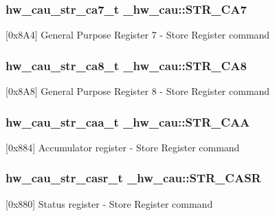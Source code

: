 \subsubsection[{\texorpdfstring{S\+T\+R\+\_\+\+C\+A7}{STR_CA7}}]{ {\bf hw\+\_\+cau\+\_\+str\+\_\+ca7\+\_\+t} \+\_\+hw\+\_\+cau\+::\+S\+T\+R\+\_\+\+C\+A7}\hypertarget{struct__hw__cau_a94bbb5f61eb9caa24f5c78de79b6b953}{}\label{struct__hw__cau_a94bbb5f61eb9caa24f5c78de79b6b953}
\mbox{[}0x8\+A4\mbox{]} General Purpose Register 7 -\/ Store Register command 
\subsubsection[{\texorpdfstring{S\+T\+R\+\_\+\+C\+A8}{STR_CA8}}]{ {\bf hw\+\_\+cau\+\_\+str\+\_\+ca8\+\_\+t} \+\_\+hw\+\_\+cau\+::\+S\+T\+R\+\_\+\+C\+A8}\hypertarget{struct__hw__cau_aac8ee0289c3891e730b41f1d7d7a96d1}{}\label{struct__hw__cau_aac8ee0289c3891e730b41f1d7d7a96d1}
\mbox{[}0x8\+A8\mbox{]} General Purpose Register 8 -\/ Store Register command 
\subsubsection[{\texorpdfstring{S\+T\+R\+\_\+\+C\+AA}{STR_CAA}}]{ {\bf hw\+\_\+cau\+\_\+str\+\_\+caa\+\_\+t} \+\_\+hw\+\_\+cau\+::\+S\+T\+R\+\_\+\+C\+AA}\hypertarget{struct__hw__cau_a1cb36095fd06149823fdd1180df6c7b2}{}\label{struct__hw__cau_a1cb36095fd06149823fdd1180df6c7b2}
\mbox{[}0x884\mbox{]} Accumulator register -\/ Store Register command 
\subsubsection[{\texorpdfstring{S\+T\+R\+\_\+\+C\+A\+SR}{STR_CASR}}]{ {\bf hw\+\_\+cau\+\_\+str\+\_\+casr\+\_\+t} \+\_\+hw\+\_\+cau\+::\+S\+T\+R\+\_\+\+C\+A\+SR}\hypertarget{struct__hw__cau_ad7073dfe5070089d5d75dee51bf6410f}{}\label{struct__hw__cau_ad7073dfe5070089d5d75dee51bf6410f}
\mbox{[}0x880\mbox{]} Status register -\/ Store Register command 
